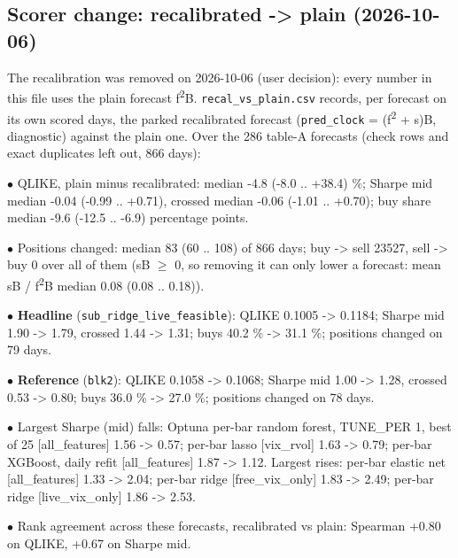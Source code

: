 \documentclass[10pt]{article}
\begin{document}
\subsection*{Scorer change: recalibrated -> plain (2026-10-06)}
The recalibration was removed on 2026-10-06 (user decision): every number in this file uses the plain forecast f\textsuperscript{2}\textperiodcentered{}B. \texttt{recal\_vs\_plain.csv} records, per forecast on its own scored days, the parked recalibrated forecast (\texttt{pred\_clock} = (f\textsuperscript{2} + s)\textperiodcentered{}B, diagnostic) against the plain one. Over the 286 table-A forecasts (check rows and exact duplicates left out, 866 days):\par
$\bullet$ QLIKE, plain minus recalibrated: median -4.8 (-8.0 .. +38.4) \%; Sharpe mid median -0.04 (-0.99 .. +0.71), crossed median -0.06 (-1.01 .. +0.70); buy share median -9.6 (-12.5 .. -6.9) percentage points.\par
$\bullet$ Positions changed: median 83 (60 .. 108) of 866 days; buy -> sell 23527, sell -> buy 0 over all of them (s\textperiodcentered{}B \ensuremath{\geq} 0, so removing it can only lower a forecast: mean s\textperiodcentered{}B /\allowbreak{} f\textsuperscript{2}\textperiodcentered{}B median 0.08 (0.08 .. 0.18)).\par
$\bullet$ \textbf{Headline} (\texttt{sub\_ridge\_live\_feasible}): QLIKE 0.1005 -> 0.1184; Sharpe mid 1.90 -> 1.79, crossed 1.44 -> 1.31; buys 40.2 \% -> 31.1 \%; positions changed on 79 days.\par
$\bullet$ \textbf{Reference} (\texttt{blk2}): QLIKE 0.1058 -> 0.1068; Sharpe mid 1.00 -> 1.28, crossed 0.53 -> 0.80; buys 36.0 \% -> 27.0 \%; positions changed on 78 days.\par
$\bullet$ Largest Sharpe (mid) falls: Optuna per-bar random forest, TUNE\_PER 1, best of 25 [all\_features] 1.56 -> 0.57; per-bar lasso [vix\_rvol] 1.63 -> 0.79; per-bar XGBoost, daily refit [all\_features] 1.87 -> 1.12. Largest rises: per-bar elastic net [all\_features] 1.33 -> 2.04; per-bar ridge [free\_vix\_only] 1.83 -> 2.49; per-bar ridge [live\_vix\_only] 1.86 -> 2.53.\par
$\bullet$ Rank agreement across these forecasts, recalibrated vs plain: Spearman +0.80 on QLIKE, +0.67 on Sharpe mid.\par
\end{document}
